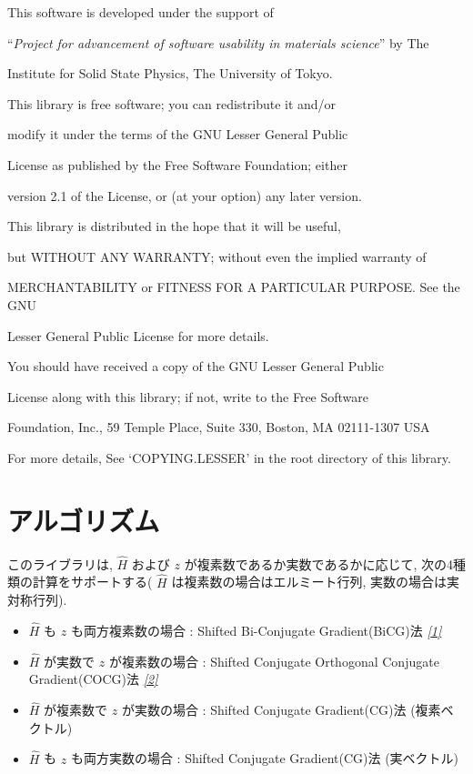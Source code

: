 \documentclass[letterpaper,10pt,dvipdfmx,openany]{sphinxmanual}
\begin{document}
\begin{DUlineblock}{0em}
\item[] This software is developed under the support of
\item[] ``\emph{Project for advancement of software usability in materials science}'' by The
\item[] Institute for Solid State Physics, The University of Tokyo.
\item[] 
\item[] This library is free software; you can redistribute it and/or
\item[] modify it under the terms of the GNU Lesser General Public
\item[] License as published by the Free Software Foundation; either
\item[] version 2.1 of the License, or (at your option) any later version.
\item[] This library is distributed in the hope that it will be useful,
\item[] but WITHOUT ANY WARRANTY; without even the implied warranty of
\item[] MERCHANTABILITY or FITNESS FOR A PARTICULAR PURPOSE. See the GNU
\item[] Lesser General Public License for more details.
\item[] 
\item[] You should have received a copy of the GNU Lesser General Public
\item[] License along with this library; if not, write to the Free Software
\item[] Foundation, Inc., 59 Temple Place, Suite 330, Boston, MA 02111-1307 USA
\item[] 
\item[] For more details, See `COPYING.LESSER' in the root directory of this library.
\end{DUlineblock}


\chapter{アルゴリズム}
\label{komega_algorithm_ja::doc}\label{komega_algorithm_ja:id1}
このライブラリは,
\({\hat H}\) および \(z\) が複素数であるか実数であるかに応じて,
次の4種類の計算をサポートする( \({\hat H}\) は複素数の場合はエルミート行列,
実数の場合は実対称行列).
\begin{itemize}
\item {} 
\({\hat H}\) も \(z\) も両方複素数の場合 : Shifted
Bi-Conjugate Gradient(BiCG)法 {\hyperref[komega_ref_ja:ref]{\emph{{[}1{]}}}}

\item {} 
\({\hat H}\) が実数で \(z\) が複素数の場合 : Shifted
Conjugate Orthogonal Conjugate Gradient(COCG)法 {\hyperref[komega_ref_ja:ref]{\emph{{[}2{]}}}}

\item {} 
\({\hat H}\) が複素数で \(z\) が実数の場合 : Shifted
Conjugate Gradient(CG)法 (複素ベクトル)

\item {} 
\({\hat H}\) も \(z\) も両方実数の場合 : Shifted Conjugate
Gradient(CG)法 (実ベクトル)

\end{itemize}
\end{document}
